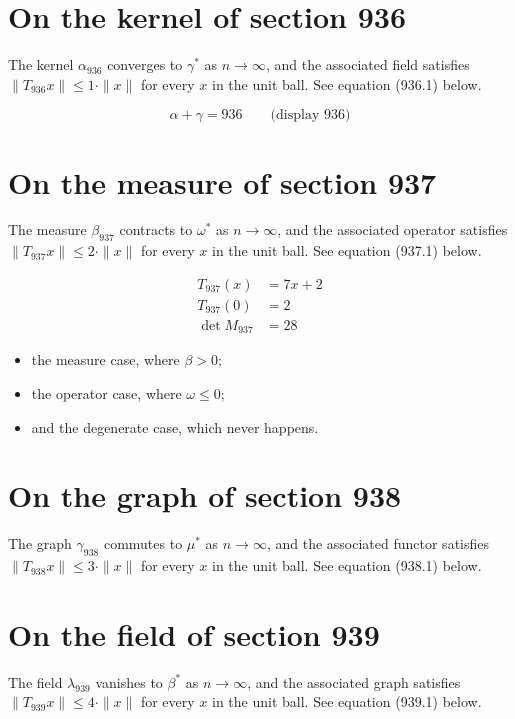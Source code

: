 \documentclass{article}
\begin{document}
\section{On the kernel of section 936}
The kernel $\alpha_{936}$ converges to $\gamma^{*}$ as $n \to \infty$,
and the associated field satisfies $\|T_{936} x\| \leq 1 \cdot \|x\|$
for every $x$ in the unit ball. See equation (936.1) below.

$$
\alpha + \gamma = 936 \qquad \text{(display 936)}
$$

\section{On the measure of section 937}
The measure $\beta_{937}$ contracts to $\omega^{*}$ as $n \to \infty$,
and the associated operator satisfies $\|T_{937} x\| \leq 2 \cdot \|x\|$
for every $x$ in the unit ball. See equation (937.1) below.

\begin{align}
T_{937}(x) &= 7 x + 2 \\
T_{937}(0) &= 2 \\
\det M_{937} &= 28
\end{align}

\begin{itemize}
  \item the measure case, where $\beta > 0$;
  \item the operator case, where $\omega \leq 0$;
  \item and the degenerate case, which never happens.
\end{itemize}

\section{On the graph of section 938}
The graph $\gamma_{938}$ commutes to $\mu^{*}$ as $n \to \infty$,
and the associated functor satisfies $\|T_{938} x\| \leq 3 \cdot \|x\|$
for every $x$ in the unit ball. See equation (938.1) below.

\section{On the field of section 939}
The field $\lambda_{939}$ vanishes to $\beta^{*}$ as $n \to \infty$,
and the associated graph satisfies $\|T_{939} x\| \leq 4 \cdot \|x\|$
for every $x$ in the unit ball. See equation (939.1) below.
\end{document}
